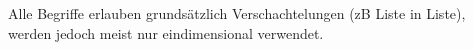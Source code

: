 Alle Begriffe erlauben grundsätzlich Verschachtelungen (zB Liste in Liste),
werden jedoch meist nur eindimensional verwendet.

%
%
